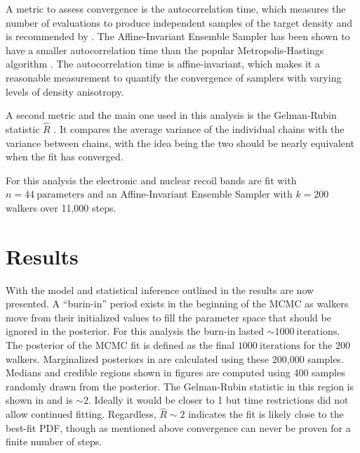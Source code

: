 A metric to assess convergence is the autocorrelation time, which measures the number
of evaluations to produce independent samples of the target density and is recommended by .  The Affine-Invariant
Ensemble Sampler has been shown to have a smaller autocorrelation time than the popular Metropolis-Hastings algorithm
.  The autocorrelation time is affine-invariant, which makes it a reasonable measurement to quantify
the convergence of samplers with varying levels of density anisotropy.

A second metric and the main one used in
this analysis is the Gelman-Rubin statistic $\hat{R}$ .  It compares the average variance of the individual chains
with the variance between chains, with the idea being the two should be nearly equivalent when the fit has converged.

For this analysis the electronic and nuclear recoil bands are fit with  $n = 44\ \mathrm{parameters}$ and an Affine-Invariant Ensemble
Sampler with $k = 200$ walkers over 11,000 steps.



\section{Results}
\label{sec:er_nr_calibrations_results}
With the model and statistical inference outlined in  the results are now
presented.  A ``burin-in'' period exists in the beginning of the MCMC as walkers move from their initialized values to fill the parameter
space that should be ignored in the posterior.  For this analysis the burn-in lasted ${\sim}1000\ \mathrm{iterations}$.  The posterior of
the MCMC fit is defined as the final $1000\ \mathrm{iterations}$ for the 200 walkers.  Marginalized posteriors in
 are
calculated using these 200,000 samples.  Medians and credible regions shown in
figures are computed using 400 samples randomly drawn from the posterior.  The Gelman-Rubin statistic in this region is
shown in  and is ${\sim}2$.  Ideally it would be closer to 1 but time restrictions did not allow
continued fitting.  Regardless, $\hat{R} \sim 2$ indicates the fit is likely close to the best-fit PDF, though as mentioned above
convergence can never be proven for a finite number of steps.

